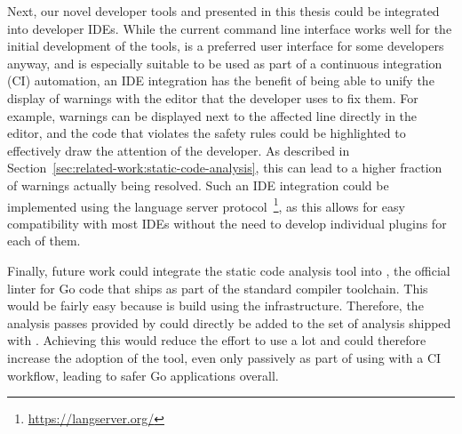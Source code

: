Next, our novel developer tools \toolGeiger{} and \toolSafer{} presented in this thesis could be integrated into
developer \acrshort{IDE}s.
While the current command line interface works well for the initial development of the tools, is a preferred user
interface for some developers anyway, and is especially suitable to be used as part of a continuous integration
(\acrshort{CI}) automation, an \acrshort{IDE} integration has the benefit of being able to unify the display of warnings
with the editor that the developer uses to fix them.
For example, \toolSafer{} warnings can be displayed next to the affected line directly in the editor, and the code that
violates the safety rules could be highlighted to effectively draw the attention of the developer.
As described in Section~\ref{sec:related-work:static-code-analysis}, this can lead to a higher fraction of warnings
actually being resolved.
Such an \acrshort{IDE} integration could be implemented using the language server
protocol~\footnote{\url{https://langserver.org/}}, as this allows for easy compatibility with most \acrshort{IDE}s
without the need to develop individual plugins for each of them.

Finally, future work could integrate the static code analysis tool \toolSafer{} into \toolVet{}, the official linter
for Go code that ships as part of the standard compiler toolchain.
This would be fairly easy because \toolSafer{} is build using the \toolVet{} infrastructure.
Therefore, the analysis passes provided by \toolSafer{} could directly be added to the set of analysis shipped with
\toolVet{}.
Achieving this would reduce the effort to use \toolSafer{} a lot and could therefore increase the adoption of the tool,
even only passively as part of using \toolVet{} with a \acrshort{CI} workflow, leading to safer Go applications overall.
